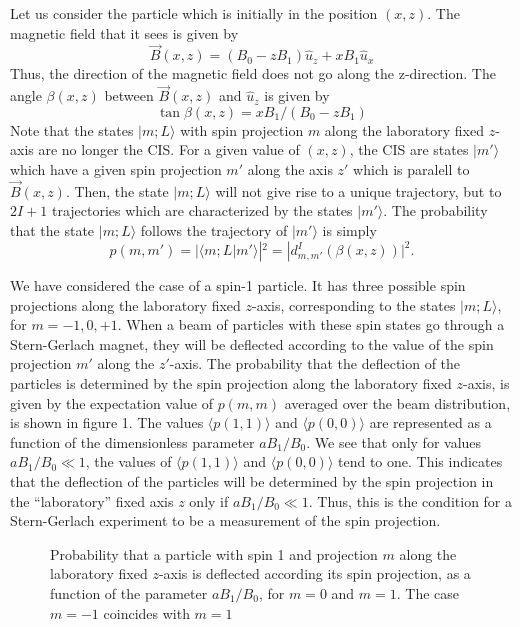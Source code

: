 \documentclass[aps,preprint,prl]{revtex4-2}
\newcommand{\be}{\begin{equation}}
\newcommand{\ee}{\end{equation}}
\begin{document}
Let us consider the particle which is initially  in the position $(x,z)$. 
The magnetic field that it sees is given by
\be
\vec B(x,z) = (B_0 - z B_1) \hat u_z + x B_1 \hat u_x
\ee
Thus, the direction of the magnetic field does not go along the z-direction.
The angle $\beta(x,z)$ between $\vec B(x,z)$ and $\hat u_z$ is given by
\be 
\tan \beta (x,z) =  x B_1 /(B_0 - z B_1)
\ee
Note that the states  $|m;L \rangle$ with spin projection $m$ along the 
laboratory fixed 
$z$-axis are no longer
the CIS. For a given value of $(x,z)$, the CIS are states $|m' \rangle$ which have
a given spin projection $m'$ along the axis $z'$ which is paralell to  
$\vec B(x,z)$. Then, the state $|m;L \rangle$ will not give rise to a unique 
trajectory,
but to $2I+1$ trajectories which are characterized by the states
$|m' \rangle$. The probability that the state $|m;L \rangle$ follows the trajectory of 
$|m' \rangle$ is simply  
\be
p(m,m') = |\langle m;L|m' \rangle|^2 = |d^I_{m,m'}(\beta(x,z))|^2.
\ee

We have considered the case of a spin-1 particle. It has three possible spin
projections along the laboratory fixed $z$-axis, corresponding to the states
$|m;L \rangle$, for $m=-1,0,+1$. When a beam of particles with these spin states
go through a Stern-Gerlach magnet, they will be deflected according to the
value of the spin projection $m'$ along the $z'$-axis. The probability that
the deflection of the particles is determined by the spin projection along
the laboratory fixed $z$-axis, is given by 
the expectation value of $p(m,m)$ averaged over the beam distribution,
is shown in figure 1. The values $\langle p(1,1) \rangle$ and $\langle p(0,0) \rangle$ are represented
as a function of the dimensionless parameter $aB_1/B_0$. We see that only 
for values $aB_1/B_0 \ll 1$, the values of $\langle p(1,1) \rangle$ and $\langle p(0,0) \rangle$ 
tend to one. This indicates that the deflection of the particles will be 
determined by the spin projection in the ``laboratory'' fixed axis $z$ only
if  $aB_1/B_0 \ll 1$. Thus, this is the condition for a Stern-Gerlach 
experiment to be a measurement of the spin projection.

\begin{center}
\begin{figure}[hbt]
\mbox{}
\vspace{1cm}
\caption{Probability that a particle with spin 1 and projection $m$ along
the laboratory fixed $z$-axis is deflected according its spin projection, 
as a function of the 
parameter $aB_1/B_0$, for $m=0$ and $m=1$. The case $m=-1$ coincides with 
$m=1$}  
\end{figure}
\end{center}
\end{document}
